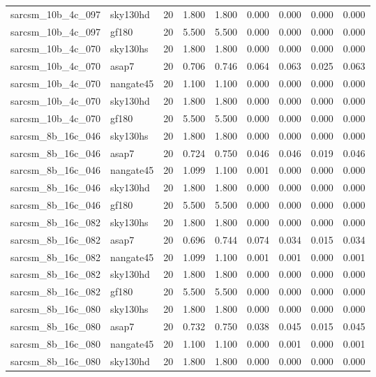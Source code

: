 \begin{tabular}{llrrrrrrr}
sarcsm\_10b\_4c\_097 & sky130hd & 20 & 1.800 & 1.800 & 0.000 & 0.000 & 0.000 & 0.000 \\
sarcsm\_10b\_4c\_097 & gf180 & 20 & 5.500 & 5.500 & 0.000 & 0.000 & 0.000 & 0.000 \\
sarcsm\_10b\_4c\_070 & sky130hs & 20 & 1.800 & 1.800 & 0.000 & 0.000 & 0.000 & 0.000 \\
sarcsm\_10b\_4c\_070 & asap7 & 20 & 0.706 & 0.746 & 0.064 & 0.063 & 0.025 & 0.063 \\
sarcsm\_10b\_4c\_070 & nangate45 & 20 & 1.100 & 1.100 & 0.000 & 0.000 & 0.000 & 0.000 \\
sarcsm\_10b\_4c\_070 & sky130hd & 20 & 1.800 & 1.800 & 0.000 & 0.000 & 0.000 & 0.000 \\
sarcsm\_10b\_4c\_070 & gf180 & 20 & 5.500 & 5.500 & 0.000 & 0.000 & 0.000 & 0.000 \\
sarcsm\_8b\_16c\_046 & sky130hs & 20 & 1.800 & 1.800 & 0.000 & 0.000 & 0.000 & 0.000 \\
sarcsm\_8b\_16c\_046 & asap7 & 20 & 0.724 & 0.750 & 0.046 & 0.046 & 0.019 & 0.046 \\
sarcsm\_8b\_16c\_046 & nangate45 & 20 & 1.099 & 1.100 & 0.001 & 0.000 & 0.000 & 0.000 \\
sarcsm\_8b\_16c\_046 & sky130hd & 20 & 1.800 & 1.800 & 0.000 & 0.000 & 0.000 & 0.000 \\
sarcsm\_8b\_16c\_046 & gf180 & 20 & 5.500 & 5.500 & 0.000 & 0.000 & 0.000 & 0.000 \\
sarcsm\_8b\_16c\_082 & sky130hs & 20 & 1.800 & 1.800 & 0.000 & 0.000 & 0.000 & 0.000 \\
sarcsm\_8b\_16c\_082 & asap7 & 20 & 0.696 & 0.744 & 0.074 & 0.034 & 0.015 & 0.034 \\
sarcsm\_8b\_16c\_082 & nangate45 & 20 & 1.099 & 1.100 & 0.001 & 0.001 & 0.000 & 0.001 \\
sarcsm\_8b\_16c\_082 & sky130hd & 20 & 1.800 & 1.800 & 0.000 & 0.000 & 0.000 & 0.000 \\
sarcsm\_8b\_16c\_082 & gf180 & 20 & 5.500 & 5.500 & 0.000 & 0.000 & 0.000 & 0.000 \\
sarcsm\_8b\_16c\_080 & sky130hs & 20 & 1.800 & 1.800 & 0.000 & 0.000 & 0.000 & 0.000 \\
sarcsm\_8b\_16c\_080 & asap7 & 20 & 0.732 & 0.750 & 0.038 & 0.045 & 0.015 & 0.045 \\
sarcsm\_8b\_16c\_080 & nangate45 & 20 & 1.100 & 1.100 & 0.000 & 0.001 & 0.000 & 0.001 \\
sarcsm\_8b\_16c\_080 & sky130hd & 20 & 1.800 & 1.800 & 0.000 & 0.000 & 0.000 & 0.000 \\

\end{tabular}
